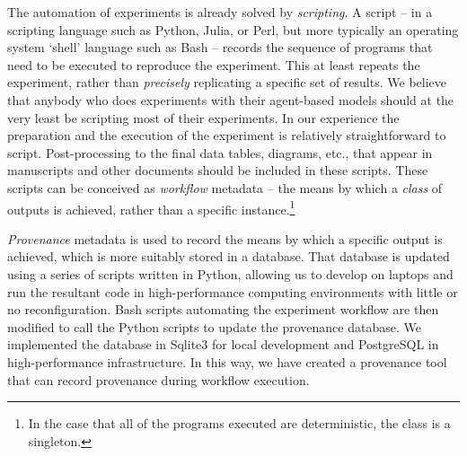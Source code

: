\documentclass[runningheads]{llncs}
\begin{document}


The automation of experiments is already solved by
\textit{scripting}. A script -- in a scripting language such as Python, Julia, or
Perl, but more typically an operating system `shell' language such as Bash --
records the sequence of programs that need to be executed to reproduce the experiment.
This at least repeats the
experiment, rather than \textit{precisely} replicating a specific set of results.
We believe that
anybody who does experiments with their agent-based models should at the
very least be scripting most of their experiments. In our experience the
preparation and the execution of the experiment is relatively straightforward
to script. Post-processing to the final data tables, diagrams, etc., that appear in
manuscripts and other documents should be included in these scripts. These scripts
can be conceived as \textit{workflow} metadata -- the means by which a \textit{class}
of outputs is achieved, rather than a specific instance.\footnote{In the case that all of the programs executed are deterministic, the class is a singleton.}

\textit{Provenance} metadata is used to record the means by which a specific output is achieved, which is more suitably stored in a 
database. That database is updated using a series of scripts written in Python, allowing us to develop on laptops and run
the resultant code in high-performance computing environments with little or
no reconfiguration. Bash scripts automating the experiment workflow are then modified to
call the Python scripts to update the provenance database. We implemented the database in Sqlite3 for local
development and PostgreSQL in high-performance infrastructure. In this way, we have created a provenance
tool that can record provenance during workflow execution.
\end{document}

